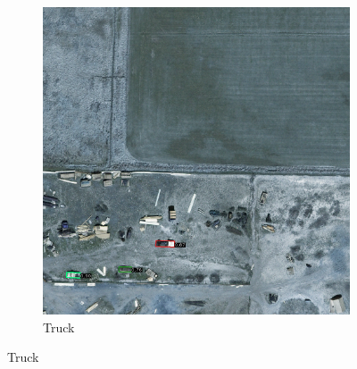 \begin{figure}[h!]
\begin{subfigure}[t]{0.38\textwidth}
        \includegraphics[width=\linewidth]{images/015Results/02perm_exp/comp_images/rgb/212.png}
        \caption{Truck}
    \end{subfigure}
    

\end{figure}
